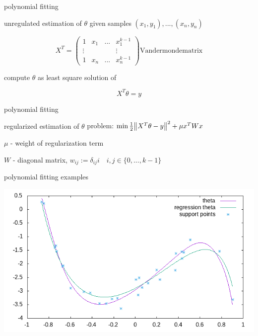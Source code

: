\documentclass{beamer}
\begin{document}
\begin{frame}{polynomial fitting}
\begin{block}{unregulated  estimation of \(\theta\)}
given samples \((x_1, y_1), ..., (x_n, y_n)\)

		\begin{equation*}
			X^T = \begin{pmatrix}
			1 & x_1 & ... & x_1^{k-1}\\
			\vdots &&& \vdots\\
			1 & x_n & ... & x_n^{k-1}
			\end{pmatrix} \text{Vandermondematrix}
		\end{equation*}
		
compute \(\theta\) as least square solution of

\begin{equation}
X^T \theta = y
\end{equation}
\end{block}
\end{frame}

\begin{frame}{polynomial fitting}
\begin{block}{regularized estimation of \(\theta\)}
	problem: \(\min \frac{1}{2} \norm{X^T  \theta -y}^2 + \mu x^TWx\)
	\vspace{0.5cm}
	\pause
	
	\(\mu\) - weight of regularization term
	
	\(W\) - diagonal matrix, \(w_{ij} := \delta_{ij} i \quad i,j \in \{0,...,k-1\}\)
\end{block}
\end{frame}

\begin{frame}{polynomial fitting examples}
\begin{center}
\includegraphics[scale=0.6]{source/theta_plot_1.png}
\end{center}
\end{frame}
\end{document}
